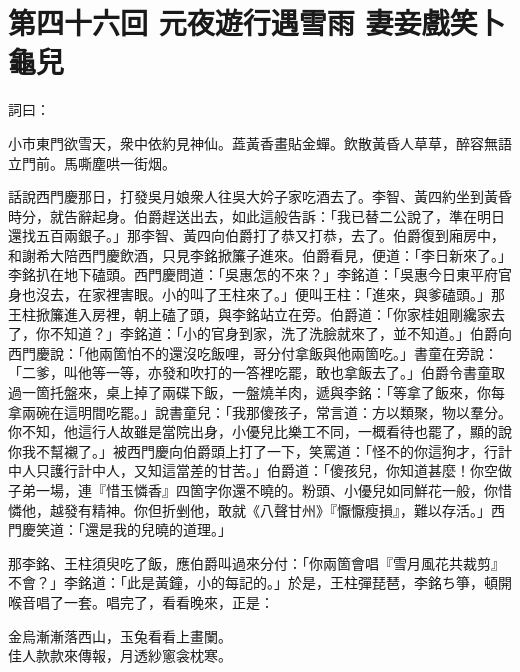 
\chapter*{第四十六回 元夜遊行遇雪雨 妻妾戲笑卜龜兒}


詞曰：

\begin{myquote}
小市東門欲雪天，衆中依約見神仙。蕋黃香畫貼金蟬。飲散黃昏人草草，醉容無語立門前。馬嘶塵哄一街烟。

\end{myquote}

話說西門慶那日，打發吳月娘衆人往吳大妗子家吃酒去了。李智、黃四約坐到黃昏時分，就告辭起身。伯爵趕送出去，如此這般告訴：「我已替二公說了，準在明日還找五百兩銀子。」那李智、黃四向伯爵打了恭又打恭，去了。伯爵復到廂房中，和謝希大陪西門慶飲酒，只見李銘掀簾子進來。伯爵看見，便道：「李日新來了。」李銘扒在地下磕頭。西門慶問道：「吳惠怎的不來？」李銘道：「吳惠今日東平府官身也沒去，在家裡害眼。小的叫了王柱來了。」便叫王柱：「進來，與爹磕頭。」那王柱掀簾進入房裡，朝上磕了頭，與李銘站立在旁。伯爵道：「你家桂姐剛纔家去了，你不知道？」李銘道：「小的官身到家，洗了洗臉就來了，並不知道。」伯爵向西門慶說：「他兩箇怕不的還沒吃飯哩，哥分付拿飯與他兩箇吃。」書童在旁說：「二爹，叫他等一等，亦發和吹打的一答裡吃罷，敢也拿飯去了。」伯爵令書童取過一箇托盤來，桌上掉了兩碟下飯，一盤燒羊肉，遞與李銘：「等拿了飯來，你每拿兩碗在這明間吃罷。」說書童兒：「我那傻孩子，常言道：方以類聚，物以羣分。你不知，他這行人故雖是當院出身，小優兒比樂工不同，一概看待也罷了，顯的說你我不幫襯了。」被西門慶向伯爵頭上打了一下，笑罵道：「怪不的你這狗才，行計中人只護行計中人，又知這當差的甘苦。」伯爵道：「傻孩兒，你知道甚麼！你空做子弟一場，連『惜玉憐香』四箇字你還不曉的。粉頭、小優兒如同鮮花一般，你惜憐他，越發有精神。你但折剉他，敢就《八聲甘州》『懨懨瘦損』，難以存活。」西門慶笑道：「還是我的兒曉的道理。」

那李銘、王柱須臾吃了飯，應伯爵叫過來分付：「你兩箇會唱『雪月風花共裁剪』不會？」李銘道：「此是黃鐘，小的每記的。」於是，王柱彈琵琶，李銘ち箏，頓開喉音唱了一套。唱完了，看看晚來，正是：

\begin{myquote}
金烏漸漸落西山，玉兔看看上畫闌。\\佳人款款來傳報，月透紗窻衾枕寒。
\end{myquote}

